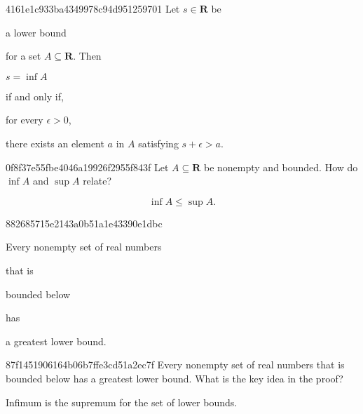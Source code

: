 \begin{note}{4161e1c933ba4349978c94d951259701}
    Let \({ s \in \mathbf{R} }\) be \begin{icloze}{5}a lower bound\end{icloze} for a set \({ A \subseteq \mathbf{R} }\).
    Then \begin{icloze}{3}\({ s = \inf A }\)\end{icloze} \begin{icloze}{4}if and only if,\end{icloze} \begin{icloze}{2}for every \({ \epsilon > 0 }\),\end{icloze} \begin{icloze}{1}there exists an element \({ a }\) in \({ A }\) satisfying \({ s + \epsilon > a }\).\end{icloze}
\end{note}

\begin{note}{0f8f37e55fbe4046a19926f2955f843f}
    Let \({ A \subseteq \mathbf{R} }\) be nonempty and bounded. How do \({ \inf A }\) and \({ \sup A }\) relate?

    \begin{cloze}{1}
        \[
            \inf A \leq \sup A.
        \]
    \end{cloze}
\end{note}

\begin{note}{882685715e2143a0b51a1e43390e1dbc}
    \begin{icloze}{1}Every nonempty set of real numbers\end{icloze} that is \begin{icloze}{2}bounded below\end{icloze} has \begin{icloze}{3}a greatest lower bound.\end{icloze}
\end{note}

\begin{note}{87f1451906164b06b7ffe3cd51a2ec7f}
    Every nonempty set of real numbers that is bounded below has a greatest lower bound.
    What is the key idea in the proof?

    \begin{cloze}{1}
        Infimum is the supremum for the set of lower bounds.
    \end{cloze}
\end{note}


